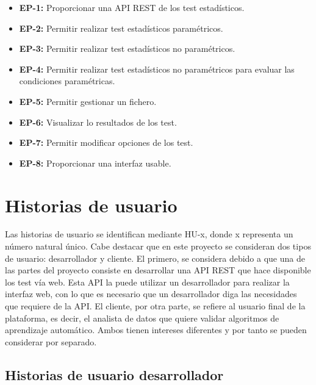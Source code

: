 \begin{itemize}
\item \textbf{EP-1:} Proporcionar una API REST de los test estadísticos.
\item \textbf{EP-2:} Permitir realizar test estadísticos paramétricos.
\item \textbf{EP-3:} Permitir realizar test estadísticos no paramétricos.
\item \textbf{EP-4:} Permitir realizar test estadísticos no paramétricos para evaluar las condiciones paramétricas.
\item \textbf{EP-5:} Permitir gestionar un fichero.
\item \textbf{EP-6:} Visualizar lo resultados de los test.
\item \textbf{EP-7:} Permitir modificar opciones de los test.
\item \textbf{EP-8:} Proporcionar una interfaz usable.
\end{itemize}


\section{Historias de usuario}
Las historias de usuario se identifican mediante HU-x, donde x representa un número natural único. Cabe destacar que en este proyecto se consideran dos tipos de usuario: desarrollador y cliente. El primero, se considera debido a que una de las partes del proyecto consiste en desarrollar una API REST que hace disponible los test vía web. Esta API la puede utilizar un desarrollador para realizar la interfaz web, con lo que es necesario que un desarrollador diga las necesidades que requiere de la API. El cliente, por otra parte, se refiere al usuario final de la plataforma, es decir, el analista de datos que quiere validar algoritmos de aprendizaje automático. Ambos tienen intereses diferentes y por tanto se pueden considerar por separado.


\subsection{Historias de usuario desarrollador} \label{hu_desarrollador}


